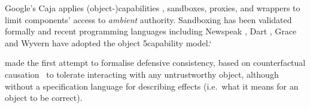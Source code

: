 








Google's Caja \cite{Caja} applies
(object-)capabilities \cite{Dennis66,JamesMorris,MillerPhD}, 
sandboxes, proxies, and wrappers
 to limit components'
access to \textit{ambient} authority.
Sandboxing has been validated
formally %
\cite{mmt-oakland10} 
and 
recent programming languages %
\cite{CapJavaHayesAPLAS17,CapNetSocc17Eide,DOCaT14} including Newspeak
\cite{newspeak17}, Dart \cite{dart15}, Grace \cite{grace,graceClasses}
and Wyvern \cite{wyverncapabilities} have adopted the object
5capability model.`


\citet{Murray10dphil} made the first attempt to formalise defensive
consistency, based on counterfactual causation~\cite{Lewis_73}
to tolerate interacting with any untrustworthy object,
although
%
%
%
without a specification language for describing effects (i.e.\ what it
means for an object to be correct).


